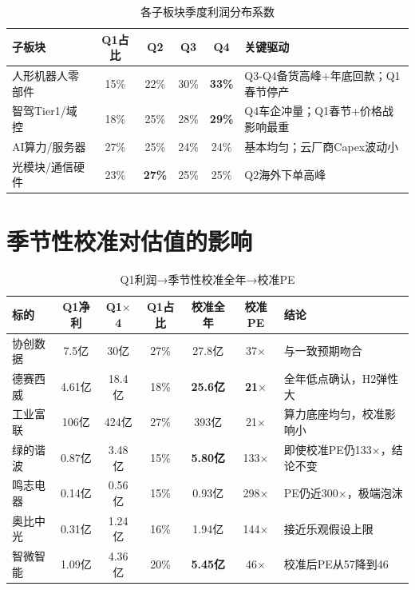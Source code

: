 \begin{table}[H]
\centering\small
\renewcommand{\arraystretch}{1.2}
\begin{tabularx}{\textwidth}{l c c c c X}
\toprule
\textbf{子板块} & \textbf{Q1占比} & \textbf{Q2} & \textbf{Q3} & \textbf{Q4} & \textbf{关键驱动} \\
\midrule
人形机器人零部件 & 15\% & 22\% & 30\% & \textbf{33\%} & Q3-Q4备货高峰+年底回款；Q1春节停产 \\
智驾Tier1/域控 & 18\% & 25\% & 28\% & \textbf{29\%} & Q4车企冲量；Q1春节+价格战影响最重 \\
AI算力/服务器 & 27\% & 25\% & 24\% & 24\% & 基本均匀；云厂商Capex波动小 \\
光模块/通信硬件 & 23\% & \textbf{27\%} & 25\% & 25\% & Q2海外下单高峰 \\
\bottomrule
\end{tabularx}
\caption{各子板块季度利润分布系数}
\end{table}

\section{季节性校准对估值的影响}

\begin{table}[H]
\centering\scriptsize
\renewcommand{\arraystretch}{1.1}
\begin{tabularx}{\textwidth}{l c c c c c X}
\toprule
\textbf{标的} & \textbf{Q1净利} & \textbf{Q1$\times$4} & \textbf{Q1占比} & \textbf{校准全年} & \textbf{校准PE} & \textbf{结论} \\
\midrule
协创数据 & 7.5亿 & 30亿 & 27\% & 27.8亿 & 37$\times$ & 与一致预期吻合 \\
德赛西威 & 4.61亿 & 18.4亿 & 18\% & \textbf{25.6亿} & \textbf{21$\times$} & 全年低点确认，H2弹性大 \\
工业富联 & 106亿 & 424亿 & 27\% & 393亿 & 21$\times$ & 算力底座均匀，校准影响小 \\
绿的谐波 & 0.87亿 & 3.48亿 & 15\% & \textbf{5.80亿} & 133$\times$ & 即使校准PE仍133$\times$，结论不变 \\
鸣志电器 & 0.14亿 & 0.56亿 & 15\% & 0.93亿 & 298$\times$ & PE仍近300$\times$，极端泡沫 \\
奥比中光 & 0.31亿 & 1.24亿 & 16\% & 1.94亿 & 144$\times$ & 接近乐观假设上限 \\
智微智能 & 1.09亿 & 4.36亿 & 20\% & \textbf{5.45亿} & 46$\times$ & 校准后PE从57降到46 \\
\bottomrule
\end{tabularx}
\caption{Q1利润→季节性校准全年→校准PE}
\end{table}

